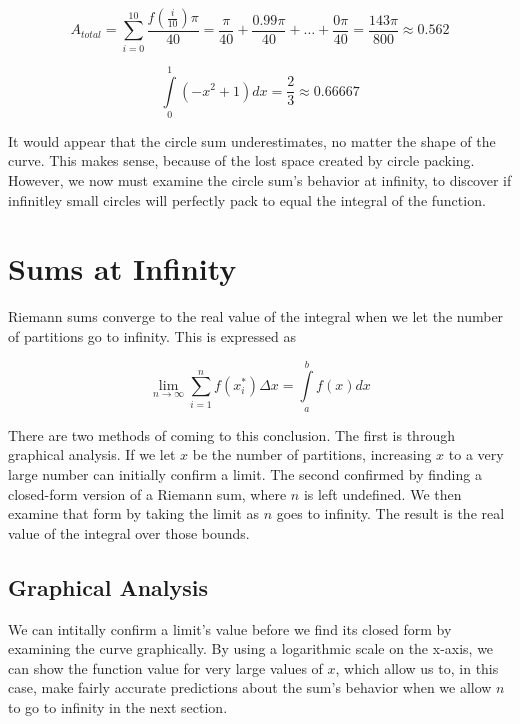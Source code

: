 \documentclass{article}
\begin{document}
    \[ A_{total} = \displaystyle \sum_{i=0}^{10} \frac{f(\frac{i}{10})\pi}{40} = \frac{\pi}{40} + \frac{0.99\pi}{40} + \dots + \frac{0\pi}{40} = \frac{143\pi}{800} \approx 0.562 \]

    \[\displaystyle \int\limits_0^1 (-x^2+1)dx = \frac{2}{3} \approx 0.66667 \]

    It would appear that the circle sum underestimates, no matter the shape of the curve. This makes sense, because of the lost space created by circle packing. However, we now must examine the circle sum's behavior at infinity, to discover if infinitley small circles will perfectly pack to equal the integral of the function.

  \section{Sums at Infinity}
    Riemann sums converge to the real value of the integral when we let the number of partitions go to infinity. This is expressed as

    \[ \displaystyle\lim_{n \to \infty}\sum_{i=1}^{n} f(x^*_i) \Delta x = \int\limits_a^b f(x)dx \]

    There are two methods of coming to this conclusion. The first is through graphical analysis. If we let \( x \) be the number of partitions, increasing \( x \) to a very large number can initially confirm a limit. The second confirmed by finding a closed-form version of a Riemann sum, where \( n \) is left undefined. We then examine that form by taking the limit as \( n \) goes to infinity. The result is the real value of the integral over those bounds.

    \subsection{Graphical Analysis}
      We can intitally confirm a limit's value before we find its closed form by examining the curve graphically. By using a logarithmic scale on the x-axis, we can show the function value for very large values of \( x \), which allow us to, in this case, make fairly accurate predictions about the sum's behavior when we allow \( n \) to go to infinity in the next section.
\end{document}
